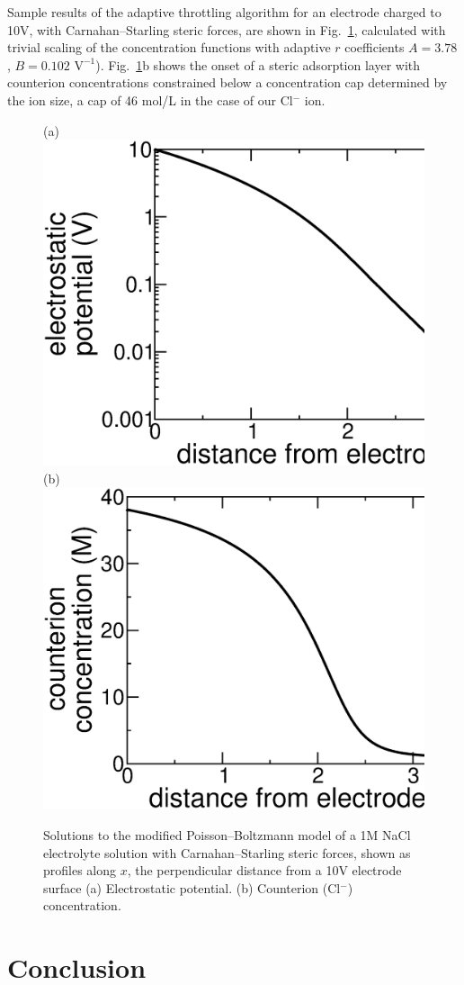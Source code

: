 Sample results of the adaptive throttling algorithm for an electrode charged to
10V, with Carnahan--Starling steric forces, are shown in
Fig.~\ref{fig_results_throttling}, calculated with trivial scaling of the
concentration functions with adaptive $r$ coefficients $A=3.78$, $B=0.102 \textrm{ V}^{-1}$).
Fig.~\ref{fig_results_throttling}b shows the onset
of a steric adsorption layer \citep{DagmawiParsons2022} with counterion
concentrations constrained below a concentration cap determined by the
ion size, a cap of 46 mol/L in the case of our {Cl}$^{-}$ ion.

\begin{figure}
\centering
(a)
\includegraphics[width=0.45\linewidth]{steric_potential_10V.eps}
(b)
\includegraphics[width=0.45\linewidth]{steric_10V_counterion.eps}
\caption{\label{fig_results_throttling}Solutions to the modified
  Poisson--Boltzmann model of a 1M NaCl electrolyte solution with
  Carnahan--Starling steric forces, shown as profiles along $x$, the
  perpendicular distance from a 10V electrode surface (a) Electrostatic
  potential. (b) Counterion ({Cl}$^{-}$) concentration. }
\end{figure}

\section{Conclusion}

